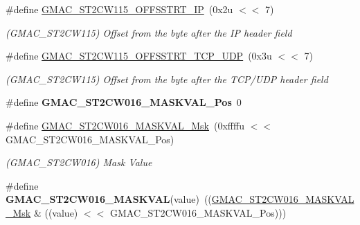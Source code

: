 \begin{DoxyCompactItemize}
\mbox{\label{group__SAMV71__GMAC_ga4056425384cabb83d02dd4669abe3f1b}} 
\#define \mbox{\hyperlink{group__SAMV71__GMAC_ga4056425384cabb83d02dd4669abe3f1b}{G\+M\+A\+C\+\_\+\+S\+T2\+C\+W115\+\_\+\+O\+F\+F\+S\+S\+T\+R\+T\+\_\+\+IP}}~(0x2u $<$$<$ 7)
\begin{DoxyCompactList}\small\item\em (G\+M\+A\+C\+\_\+\+S\+T2\+C\+W115) Offset from the byte after the IP header field \end{DoxyCompactList}\item 
\mbox{\label{group__SAMV71__GMAC_ga1d08bb4fd7578ca3b5b3eaa8091b956b}} 
\#define \mbox{\hyperlink{group__SAMV71__GMAC_ga1d08bb4fd7578ca3b5b3eaa8091b956b}{G\+M\+A\+C\+\_\+\+S\+T2\+C\+W115\+\_\+\+O\+F\+F\+S\+S\+T\+R\+T\+\_\+\+T\+C\+P\+\_\+\+U\+DP}}~(0x3u $<$$<$ 7)
\begin{DoxyCompactList}\small\item\em (G\+M\+A\+C\+\_\+\+S\+T2\+C\+W115) Offset from the byte after the T\+C\+P/\+U\+DP header field \end{DoxyCompactList}\item 
\mbox{\label{group__SAMV71__GMAC_ga2e0b01f05028b92586613053d3e8003e}} 
\#define {\bfseries G\+M\+A\+C\+\_\+\+S\+T2\+C\+W016\+\_\+\+M\+A\+S\+K\+V\+A\+L\+\_\+\+Pos}~0
\item 
\mbox{\label{group__SAMV71__GMAC_gaff3b6dcc87b79b538e7e4a9d587e3ebf}} 
\#define \mbox{\hyperlink{group__SAMV71__GMAC_gaff3b6dcc87b79b538e7e4a9d587e3ebf}{G\+M\+A\+C\+\_\+\+S\+T2\+C\+W016\+\_\+\+M\+A\+S\+K\+V\+A\+L\+\_\+\+Msk}}~(0xffffu $<$$<$ G\+M\+A\+C\+\_\+\+S\+T2\+C\+W016\+\_\+\+M\+A\+S\+K\+V\+A\+L\+\_\+\+Pos)
\begin{DoxyCompactList}\small\item\em (G\+M\+A\+C\+\_\+\+S\+T2\+C\+W016) Mask Value \end{DoxyCompactList}\item 
\mbox{\label{group__SAMV71__GMAC_gac4c01111b879a89d2427383ecc97029d}} 
\#define {\bfseries G\+M\+A\+C\+\_\+\+S\+T2\+C\+W016\+\_\+\+M\+A\+S\+K\+V\+AL}(value)~((\mbox{\hyperlink{group__SAMV71__GMAC_gaff3b6dcc87b79b538e7e4a9d587e3ebf}{G\+M\+A\+C\+\_\+\+S\+T2\+C\+W016\+\_\+\+M\+A\+S\+K\+V\+A\+L\+\_\+\+Msk}} \& ((value) $<$$<$ G\+M\+A\+C\+\_\+\+S\+T2\+C\+W016\+\_\+\+M\+A\+S\+K\+V\+A\+L\+\_\+\+Pos)))

\end{DoxyCompactItemize}
